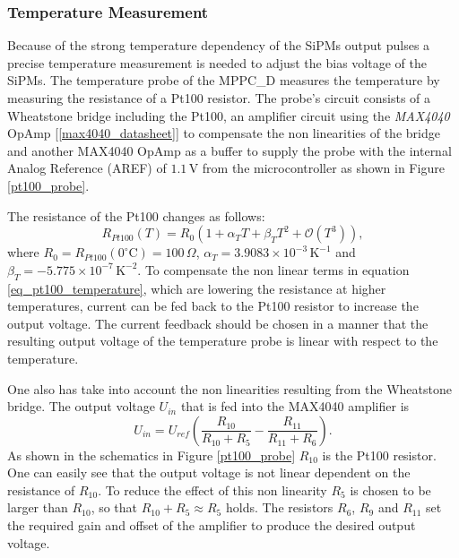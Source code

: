 \documentclass[]{article}
\begin{document}
\newpage

\subsubsection{Temperature Measurement}

Because of the strong temperature dependency of the SiPMs output pulses a precise temperature measurement is needed to adjust the bias voltage of the SiPMs. The temperature probe of
the MPPC\_D measures the temperature by measuring the resistance of a Pt100 resistor. The probe's circuit consists of a Wheatstone bridge including the Pt100, an amplifier circuit using
the \emph{MAX4040} OpAmp [\ref{max4040_datasheet}] to compensate the non linearities of the bridge and another MAX4040 OpAmp as a buffer to supply the probe with the
internal Analog Reference (AREF) of $1.1\,\text{V}$ from the microcontroller as shown in Figure \ref{pt100_probe}.

The resistance of the Pt100 changes as follows:
	\begin{equation}
		R_{Pt100}(T) = R_0(1 +\alpha_T T + \beta_T T^2 + \mathcal{O}(T^3)),
		\label{eq_pt100_temperature}
	\end{equation}
where $R_0 = R_{Pt100}(0^{\circ} \text{C})=100\,\Omega$, $\alpha_T = 3.9083 \times 10^{-3}\, \text{K}^{-1}$ and $\beta_T = -5.775 \times 10^{-7}\, \text{K}^{-2}$. To compensate 
the non linear terms in equation \ref{eq_pt100_temperature}, which are lowering the resistance at higher temperatures, current can be fed back to the Pt100 resistor to increase 
the output voltage. The current feedback should be chosen in a manner that the resulting output voltage of the temperature probe is linear with respect to the temperature.

One also has take into account the non linearities resulting from the Wheatstone bridge. The output voltage $U_{in}$ that is fed into the MAX4040 amplifier is
	\begin{equation}
		U_{in} = U_{ref}(\frac{R_{10}}{R_{10} + R_5} - \frac{R_{11}}{R_{11} + R_6}).
	\end{equation}
As shown in the schematics in Figure \ref{pt100_probe} $R_{10}$ is the Pt100 resistor. One can easily see that the output voltage is not linear dependent on the resistance
of $R_{10}$. To reduce the effect of this non linearity $R_{5}$ is chosen to be larger than $R_{10}$, so that $R_{10} + R_{5} \approx R_{5}$ holds. The resistors $R_6$, $R_9$ and 
$R_{11}$ set the required gain and offset of the amplifier to produce the desired output voltage. 
\end{document}
